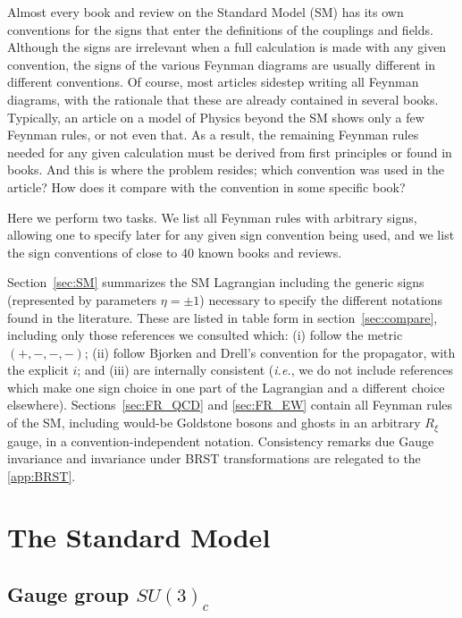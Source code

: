 \documentclass{ws-ijmpa}
\begin{document}
Almost every book and review on the Standard Model (SM) has its own
conventions for the signs that enter the definitions of the couplings
and fields.  Although the signs are irrelevant when a full calculation
is made with any given convention, the signs of the various Feynman
diagrams are usually different in different conventions.  Of course,
most articles sidestep writing all Feynman diagrams, with the
rationale that these are already contained in several books.
Typically, an article on a model of Physics beyond the SM shows only a
few Feynman rules, or not even that.  As a result, the remaining
Feynman rules needed for any given calculation must be derived from
first principles or found in books.  And this is where the problem
resides; which convention was used in the article?  How does it
compare with the convention in some specific book?

Here we perform two tasks. We list all Feynman rules with arbitrary
signs, allowing one to specify later for any given sign convention
being used,
and we list the sign conventions of close to 40 known books and
reviews.

Section~\ref{sec:SM} summarizes the SM Lagrangian
including the generic signs (represented by parameters $\eta=\pm 1$)
necessary to specify the different notations found in the literature.
These are listed in table form in section~\ref{sec:compare},
including only those references we consulted which:
(i) follow the metric $(+,-,-,-)$;
(ii) follow Bjorken and Drell's \cite{BD} convention for the propagator,
with the explicit $i$;
and (iii) are internally consistent
(\textit{i.e.}, we do not include references which make
one sign choice in one part of the Lagrangian and a different choice elsewhere).
Sections~\ref{sec:FR_QCD} and \ref{sec:FR_EW} contain all Feynman rules of the SM,
including would-be Goldstone bosons and ghosts in an arbitrary $R_\xi$ gauge,
in a convention-independent notation.
Consistency remarks due Gauge invariance and
invariance under BRST transformations are relegated
to the \ref{app:BRST}.

\section{\label{sec:SM}The Standard Model}

\subsection{Gauge group $SU(3)_c$}
\end{document}
